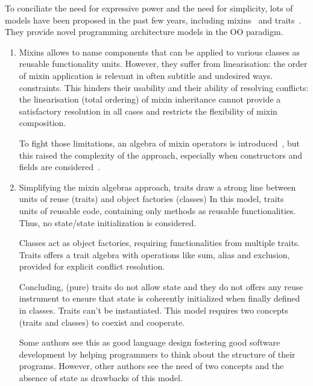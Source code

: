 To conciliate the need for expressive power and the need for simplicity, 
lots of models have been proposed in the past few
years, including mixins~\cite{bracha90mixin} and traits~\cite{scharli03traits}.
They provide novel programming architecture models in the
OO paradigm. 
\begin{enumerate}
\item  Mixins allows to name components that can be applied to various classes as
reusable functionality units. However,  they suffer from linearisation: the order of mixin application is relevant in often subtitle and undesired ways. constraints. This hinders their
usability and their ability of resolving conflicts:
 the linearisation (total ordering) of mixin inheritance cannot provide a satisfactory resolution in all cases and restricts the flexibility of mixin composition.

 To fight those limitations, an algebra of mixin operators is introduced~\cite{CMS elena zucca davide ancona}, but this raised the complexity of the approach, especially when constructors and fields are considered~\cite{Ecoop FJigsaw marco}.

\item 
Simplifying the mixin algebras approach, traits draw a strong line between units of reuse (traits) and object factories (classes)
In this model, traits~\cite{Scharli2003} units of reusable code,  containing only methods as
reusable functionalities. Thus, no state/state initialization is considered.

Classes act as object factories, requiring functionalities from multiple traits.
Traits offers a trait algebra  with operations like sum, alias and exclusion, provided for explicit conflict resolution.


Concluding, (pure) traits do not allow state and they do not offers any reuse instrument to ensure that state is coherently initialized when finally defined in classes.
Traits can't be instantiated. This model requires two concepts (traits and classes) to coexist and cooperate.

Some authors see this as good language design fostering good software development by helping programmers to think about the structure of their programs.
However, other authors see the need of two concepts and the absence of state as drawbacks of this model.


\end{enumerate}
